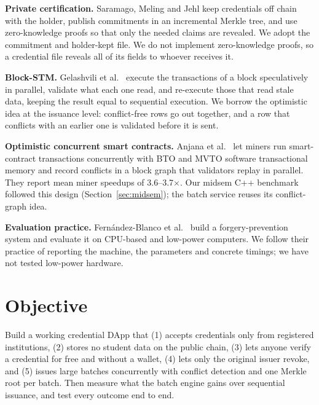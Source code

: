 \documentclass[10pt,twocolumn]{article}
\begin{document}
\textbf{Private certification.} Saramago, Meling and Jehl \cite{saramago2022} keep credentials off chain with the holder, publish commitments in an incremental Merkle tree, and use zero-knowledge proofs so that only the needed claims are revealed. We adopt the commitment and holder-kept file. We do not implement zero-knowledge proofs, so a credential file reveals all of its fields to whoever receives it.

\textbf{Block-STM.} Gelashvili et al.\ \cite{gelashvili2023} execute the transactions of a block speculatively in parallel, validate what each one read, and re-execute those that read stale data, keeping the result equal to sequential execution. We borrow the optimistic idea at the issuance level: conflict-free rows go out together, and a row that conflicts with an earlier one is validated before it is sent.

\textbf{Optimistic concurrent smart contracts.} Anjana et al.\ \cite{anjana2019} let miners run smart-contract transactions concurrently with BTO and MVTO software transactional memory and record conflicts in a block graph that validators replay in parallel. They report mean miner speedups of 3.6--3.7$\times$. Our midsem C++ benchmark followed this design (Section~\ref{sec:midsem}); the batch service reuses its conflict-graph idea.

\textbf{Evaluation practice.} Fern\'andez-Blanco et al.\ \cite{fernandez2024} build a forgery-prevention system and evaluate it on CPU-based and low-power computers. We follow their practice of reporting the machine, the parameters and concrete timings; we have not tested low-power hardware.

\section{Objective}
Build a working credential DApp that (1) accepts credentials only from registered institutions, (2) stores no student data on the public chain, (3) lets anyone verify a credential for free and without a wallet, (4) lets only the original issuer revoke, and (5) issues large batches concurrently with conflict detection and one Merkle root per batch. Then measure what the batch engine gains over sequential issuance, and test every outcome end to end.
\end{document}
